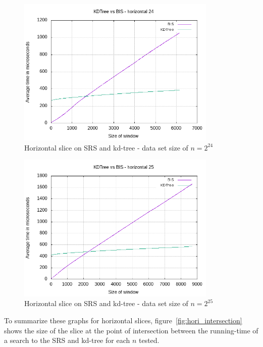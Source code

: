 \begin{figure}[h]
    \centering
    \includegraphics[width = 0.85\textwidth]{pictures/analysis/hori_24.png}
    \caption{Horizontal slice on SRS and kd-tree - data set size of $n=2^{24}$}\label{fig:hori_24}
\end{figure}

\begin{figure}[h]
    \centering
    \includegraphics[width = 0.85\textwidth]{pictures/analysis/hori_25.png}
    \caption{Horizontal slice on SRS and kd-tree - data set size of $n=2^{25}$}\label{fig:hori_25}
\end{figure}


To summarize these graphs for horizontal slices, figure~\ref{fig:hori_intersection} shows the size of the slice at the point of intersection between the running-time of a search to the SRS and kd-tree for each $n$ tested.

